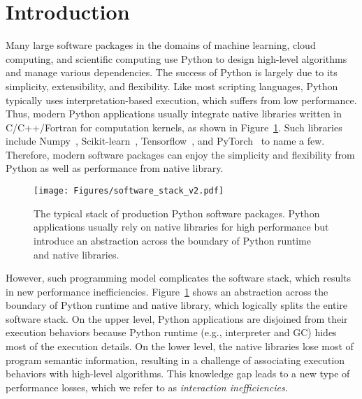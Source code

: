 \section{Introduction}
\label{intro}

 Many large software packages in the domains of machine learning, cloud computing, and scientific computing use Python to design high-level algorithms and manage various dependencies. The success of Python is largely due to its simplicity, extensibility, and flexibility. Like most scripting languages, Python typically uses interpretation-based execution, which suffers from low performance. Thus, modern Python applications usually integrate native libraries written in C/C++/Fortran for computation kernels, as shown in Figure~\ref{fig:hybridmode}. Such libraries include Numpy~\cite{van2011numpy, harris2020array}, Scikit-learn~\cite{scikit-learn}, Tensorflow~\cite{tensorflow2015-whitepaper}, and PyTorch~\cite{paszke2017automatic} to name a few. Therefore, modern software packages can enjoy the simplicity and flexibility from Python as well as performance from native library.

\begin{figure}[t]
	\centering
	\texttt{[image: Figures/software\_stack\_v2.pdf]}
	\caption{The typical stack of production Python software packages. Python applications usually rely on native libraries for high performance but introduce an abstraction across the boundary of Python runtime and native libraries.}
	\label{fig:hybridmode}
\end{figure}

However, such programming model complicates the software stack, which results in new performance inefficiencies. Figure~\ref{fig:hybridmode} shows an abstraction across the boundary of Python runtime and native library, which logically splits the entire software stack. On the upper level, Python applications are disjoined from their execution behaviors because Python runtime (e.g., interpreter and GC) hides most of the execution details. On the lower level, the native libraries lose most of program semantic information, resulting in a challenge of associating execution behaviors with high-level algorithms. This knowledge gap leads to a new type of performance losses, which we refer to as {\em interaction inefficiencies}.

 
